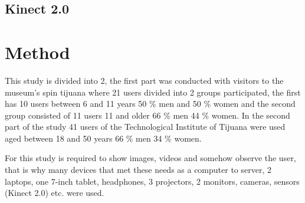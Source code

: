 \documentclass[journal]{IEEEtran}
\begin{document}
\subsection {Kinect 2.0}

\section {Method}
\setlength{\parskip}{10pt}

This study is divided into 2, the first part was conducted with visitors to the museum's spin tijuana where 21 users divided into 2 groups participated, the first has 10 users between 6 and 11 years 50 \% men and 50 \% women and the second group consisted of 11 users 11 and older 66 \% men 44 \% women. In the second part of the study 41 users of the Technological Institute of Tijuana were used aged between 18 and 50 years 66 \% men 34 \% women.


For this study is required to show images, videos and somehow observe the user, that is why many devices that met these needs as a computer to server, 2 laptops, one 7-inch tablet, headphones, 3 projectors, 2 monitors, cameras, sensors (Kinect 2.0) etc. were used.
    
\end{document}
